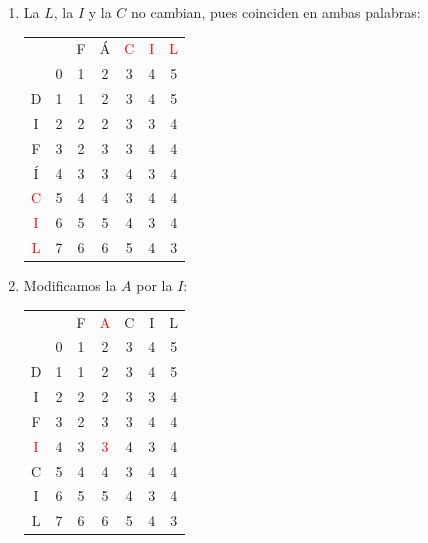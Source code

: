 \documentclass[10pt,a4paper,spanish]{report}
\theoremstyle{definition}
\theoremstyle{remark}
\begin{document}
\begin{enumerate}
    \item La $L$, la $I$ y la $C$ no cambian, pues coinciden en ambas palabras:
\begin{center}
\begin{tabular}{c|c|c|c|c|c|c|}
\multicolumn{2}{r}{} & \multicolumn{1}{c}{F} & \multicolumn{1}{c}{Á} & \multicolumn{1}{c}{\textcolor{Red}{C}} & \multicolumn{1}{c}{\textcolor{Red}{I}} & \multicolumn{1}{c}{\textcolor{Red}{L}} \\ 
\cline{2-7} 
 & 0 & 1 & 2 & 3 & 4 & 5 \\
\cline{2-7}
D & 1 & 1 & 2 & 3 & 4 & 5 \\
\cline{2-7} 
I & 2 & 2 & 2 & 3 & 3 & 4 \\
\cline{2-7} 
F & 3 & 2 & 3 & 3 & 4 & 4 \\
\cline{2-7} 
Í & 4 & 3 & 3 & 4 & 3 & 4 \\
\cline{2-7} 
\textcolor{Red}{C} & 5 & 4 & 4 & \cellcolor{Green}3 & 4 & 4 \\
\cline{2-7} 
\textcolor{Red}{I} & 6 & 5 & 5 & 4 & \cellcolor{Green}3 & 4 \\
\cline{2-7} 
\textcolor{Red}{L} & 7 & 6 & 6 & 5 & 4 & \cellcolor{Green}3 \\
\cline{2-7}  
\end{tabular}
\end{center}

\item Modificamos la $A$ por la $I$:
\begin{center}
\begin{tabular}{c|c|c|c|c|c|c|}
\multicolumn{2}{r}{} & \multicolumn{1}{c}{F} & \multicolumn{1}{c}{\textcolor{Red}{A}} & \multicolumn{1}{c}{C} & \multicolumn{1}{c}{I} & \multicolumn{1}{c}{L} \\ 
\cline{2-7} 
 & 0 & 1 & 2 & 3 & 4 & 5 \\
\cline{2-7}
D & 1 & 1 & 2 & 3 & 4 & 5 \\
\cline{2-7} 
I & 2 & 2 & 2 & 3 & 3 & 4 \\
\cline{2-7} 
F & 3 & \cellcolor{Cyan}2 & 3 & 3 & 4 & 4 \\
\cline{2-7} 
\textcolor{Red}{I} & 4 & 3 & \textcolor{Red}{3} & 4 & 3 & 4 \\
\cline{2-7} 
C & 5 & 4 & 4 & \cellcolor{Green}3 & 4 & 4 \\
\cline{2-7} 
I & 6 & 5 & 5 & 4 & \cellcolor{Green}3 & 4 \\
\cline{2-7} 
L & 7 & 6 & 6 & 5 & 4 & \cellcolor{Green}3 \\
\cline{2-7}  
\end{tabular}
\end{center}


\end{enumerate}
\end{document}
